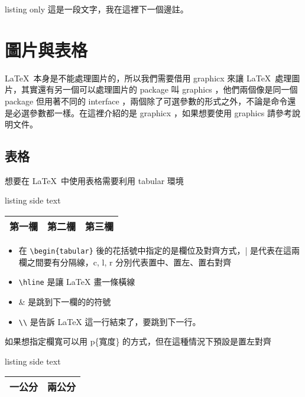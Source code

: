 \begin{tcblisting}{listing only}
這是一段文字，我在這裡下一個邊註。
\end{tcblisting}

\section{圖片與表格}

\LaTeX\ 本身是不能處理圖片的，所以我們需要借用 graphicx 來讓 \LaTeX\ 處理圖片，其實還有另一個可以處理圖片的 package 叫 graphics ，他們兩個像是同一個 package 但用著不同的 interface ，兩個除了可選參數的形式之外，不論是命令還是必選參數都一樣。在這裡介紹的是 graphicx ，如果想要使用 graphics 請參考說明文件。

\subsection{表格}

想要在 \LaTeX\ 中使用表格需要利用 tabular 環境

\begin{tcblisting}{listing side text}
\begin{tabular}{| c | l r |}
\hline
第一欄 & 第二欄 & 第三欄 \\
\hline
\end{tabular}
\end{tcblisting}

\begin{itemize}
\item 在 \verb|\begin{tabular}| 後的花括號中指定的是欄位及對齊方式，| 是代表在這兩欄之間要有分隔線，c, l, r 分別代表置中、置左、置右對齊
\item \verb|\hline| 是讓 LaTeX 畫一條橫線
\item \& 是跳到下一欄的的符號
\item \verb|\\| 是告訴 LaTeX 這一行結束了，要跳到下一行。
\end{itemize}

如果想指定欄寬可以用 p\{寬度\} 的方式，但在這種情況下預設是置左對齊

\begin{tcblisting}{listing side text}
\begin{tabular}{|p{1cm}|p{2cm}|}
\hline
一公分 & 兩公分 \\
\hline
\end{tabular}
\end{tcblisting}

